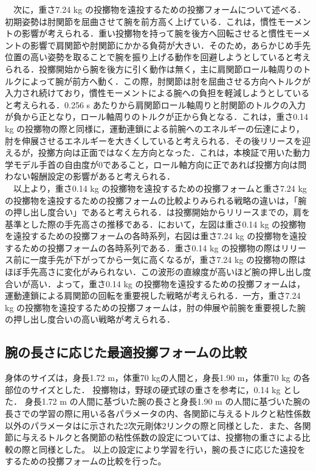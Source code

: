 \begin{small}
　次に，重さ7.24 kg の投擲物を遠投するための投擲フォームについて述べる．初期姿勢は肘関節を屈曲させて腕を前方高く上げている．これは，慣性モーメントの影響が考えられる．重い投擲物を持って腕を後方へ回転させると慣性モーメントの影響で肩関節や肘関節にかかる負荷が大きい．そのため，あらかじめ手先位置の高い姿勢を取ることで腕を振り上げる動作を回避しようとしていると考えられる．投擲開始から腕を後方に引く動作は無く，主に肩関節ロール軸周りのトルクによって腕が前方へ動く．この際，肘関節は肘を屈曲させる方向へトルクが入力され続けており，慣性モーメントによる腕への負担を軽減しようとしていると考えられる．0.256 s あたりから肩関節ロール軸周りと肘関節のトルクの入力が負から正となり，ロール軸周りのトルクが正から負となる．これは，重さ0.14 kg の投擲物の際と同様に，運動連鎖による前腕へのエネルギーの伝達により，肘を伸展させるエネルギーを大きくしていると考えられる．その後リリースを迎えるが，投擲方向は正面ではなく左方向となった．これは，本検証で用いた動力学モデル手首の自由度が0であること，ロール軸方向に正であれば投擲方向は問わない報酬設定の影響があると考えられる．\\
　以上より，重さ0.14 kg の投擲物を遠投するための投擲フォームと重さ7.24 kg の投擲物を遠投するための投擲フォームの比較よりみられる戦略の違いは，「腕の押し出し度合い」であると考えられる．は投擲開始からリリースまでの，肩を基準とした際の手先高さの推移である．において，左図は重さ0.14 kg の投擲物を遠投するための投擲フォームの各時系列，右図は重さ7.24 kg の投擲物を遠投するための投擲フォームの各時系列である．重さ0.14 kg の投擲物の際はリリース前に一度手先が下がってから一気に高くなるが，重さ7.24 kg の投擲物の際はほぼ手先高さに変化がみられない．この波形の直線度が高いほど腕の押し出し度合いが高い．よって，重さ0.14 kg の投擲物を遠投するための投擲フォームは，運動連鎖による肩関節の回転を重要視した戦略が考えられる．一方，重さ7.24 kg の投擲物を遠投するための投擲フォームは，肘の伸展や前腕を重要視した腕の押し出し度合いの高い戦略が考えられる．
\subsection{腕の長さに応じた最適投擲フォームの比較}
身体のサイズは，身長1.72 m，体重70 kgの人間と，身長1.90 m，体重70 kg の各部位のサイズとした．
投擲物は，野球の硬式球の重さを参考に，0.14 kg とした．
身長1.72 m の人間に基づいた腕の長さと身長1.90 m の人間に基づいた腕の長さでの学習の際に用いる各パラメータの内、各関節に与えるトルクと粘性係数以外のパラメータはに示された2次元剛体2リンクの際と同様とした．また、各関節に与えるトルクと各関節の粘性係数の設定については、投擲物の重さによる比較の際と同様とした。
以上の設定により学習を行い，腕の長さに応じた遠投をするための投擲フォームの比較を行った。

\end{small}
